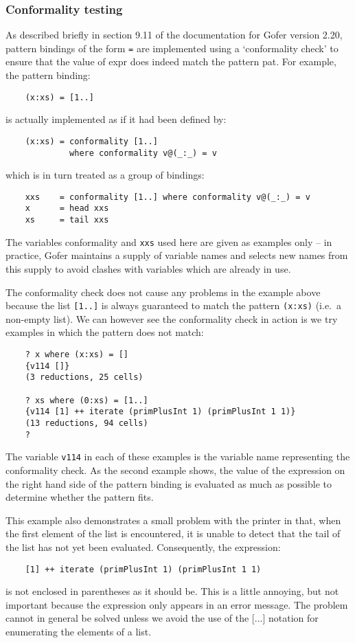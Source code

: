 \subsubsection{Conformality testing}
As described briefly in section 9.11 of the documentation for Gofer
version 2.20, pattern bindings of the form \verb"="
are implemented
using a `conformality check' to ensure that the value of expr does
indeed match the pattern pat.  For example, the pattern binding:
\begin{verbatim}
    (x:xs) = [1..]
\end{verbatim}
is actually implemented as if it had been defined by:
\begin{verbatim}
    (x:xs) = conformality [1..]
             where conformality v@(_:_) = v
\end{verbatim}
which is in turn treated as a group of bindings:
\begin{verbatim}
    xxs    = conformality [1..] where conformality v@(_:_) = v
    x      = head xxs
    xs     = tail xxs
\end{verbatim}
The variables conformality and \verb"xxs" used here are given as examples
only -- in practice, Gofer maintains a supply of variable names and
selects new names from this supply to avoid clashes with variables
which are already in use.

The conformality check does not cause any problems in the example
above because the list \verb"[1..]" is always guaranteed to match the
pattern \verb"(x:xs)" (i.e.\ a non-empty list).  We can however see the
conformality check in action is we try examples in which the pattern
does not match:
\begin{verbatim}
    ? x where (x:xs) = []
    {v114 []}
    (3 reductions, 25 cells)

    ? xs where (0:xs) = [1..]
    {v114 [1] ++ iterate (primPlusInt 1) (primPlusInt 1 1)}
    (13 reductions, 94 cells)
    ?
\end{verbatim}
The variable \verb"v114" in each of these examples is the variable name
representing the conformality check.  As the second example shows, the
value of the expression on the right hand side of the pattern binding
is evaluated as much as possible to determine whether the pattern
fits.

This example also demonstrates a small problem with the printer
in that, when the first element of the list is encountered, it is
unable to detect that the tail of the list has not yet been evaluated.
Consequently, the expression:
\begin{verbatim}
    [1] ++ iterate (primPlusInt 1) (primPlusInt 1 1)
\end{verbatim}
is not enclosed in parentheses as it should be.  This is a little
annoying, but not important because the expression only appears in an
error message.  The problem cannot in general be solved unless we avoid
the use of the [...] notation for enumerating the elements of a list.

